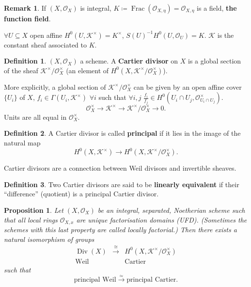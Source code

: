 \documentclass[12pt]{article}
\DeclareMathOperator{\Frac}{Frac}
\DeclareMathOperator{\Div}{Div}
\newtheorem*{proposition}{Proposition}
\theoremstyle{definition}
\newtheorem*{definition}{Definition}
\newtheorem*{remark}{Remark}
\begin{document}
\begin{remark}
If $(X,\mathcal{O}_X)$ is integral, $K\coloneqq\Frac(\mathcal{O}_{X,\eta})=\mathcal{O}_{X,\eta}$ is a field, \textbf{the function field}.

$\forall U\subseteq X$ open affine $H^0(U,\mathcal{K}^{\times})=K^{\times}$, $S(U)^{-1}H^0(U,\mathcal{O}_U)=K$. $\mathcal{K}$ is the constant sheaf associated to $K$.
\end{remark}

\begin{definition}
$(X,\mathcal{O}_X)$ a scheme. A \textbf{Cartier divisor} on $X$ is a global section of the sheaf $\mathcal{K}^{\times}/\mathcal{O}_X^{\times}$ (an element of $H^0(X,\mathcal{K}^{\times}/\mathcal{O}_X^{\times})$).
\end{definition}

More explicitly, a global section of $\mathcal{K}^{\times}/\mathcal{O}_X^{\times}$ can be given by an open affine cover $\{U_i\}$ of $X$, $f_i\in\Gamma(U_i,\mathcal{K}^{\times})$ $\forall i$ such that $\forall i,j$ $\frac{f_i}{f_j}\in H^0(U_i\cap U_j,\mathcal{O}_{U_i\cap U_j}^{\times})$.
\[\mathcal{O}_X^{\times}\longrightarrow\mathcal{K}^{\times}\longrightarrow\mathcal{K}^{\times}/\mathcal{O}_X^{\times}\longrightarrow0.\]
Units are all equal in $\mathcal{O}_X^{\times}$.

\begin{definition}
A Cartier divisor is called \textbf{principal} if it lies in the image of the natural map
\[H^0(X,\mathcal{K}^{\times})\longrightarrow H^0(X,\mathcal{K}^{\times}/\mathcal{O}_X^{\times}).\]
\end{definition}

Cartier divisors are a connection between Weil divisors and invertible sheaves.

\begin{definition}
Two Cartier divisors are said to be \textbf{linearly equivalent} if their ``difference'' (quotient) is a principal Cartier divisor.
\end{definition}

\begin{proposition}
Let $(X,\mathcal{O}_X)$ be an integral, separated, Noetherian scheme such that all local rings $\mathcal{O}_{X,x}$ are unique factorisation domains (UFD). (Sometimes the schemes with this last property are called locally factorial.) Then there exists a natural isomorphism of groups
\[
\begin{array}{ccc}
\Div(X)&\overset{\cong}{\longrightarrow}&H^0(X,\mathcal{K}^{\times}/\mathcal{O}_X^{\times})\\
\text{Weil}&&\text{Cartier}
\end{array}
\]
such that
\[\text{principal Weil}\overset{\simeq}{\longrightarrow}\text{principal Cartier}.\]
\end{proposition}
\end{document}
